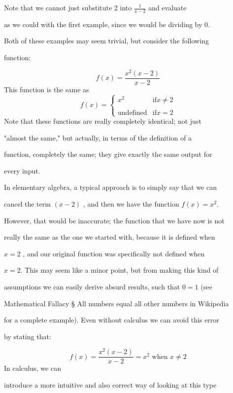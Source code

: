 Note that we cannot just substitute 2 into $\frac{1}{x-2}$ and evaluate

as we could with the first example, since we would be dividing by 0.



Both of these examples may seem trivial, but consider the following

function:



$$f(x)=\frac{x^2(x-2)}{x-2}$$ This function is the same as
$$
f(x)=

\begin{cases}

x^2 & \text{if} x \ne 2 \\\\ \text{undefined} & \text{if} x=2 

\end{cases}
$$
Note that these functions are really completely identical; not just

"almost the same," but actually, in terms of the definition of a

function, completely the same; they give exactly the same output for

every input.



In elementary algebra, a typical approach is to simply say that we can

cancel the term $(x-2)$ , and then we have the function $f(x)=x^2$.

However, that would be inaccurate; the function that we have now is not

really the same as the one we started with, because it is defined when

$x=2$ , and our original function was specifically not defined when

$x=2$. This may seem like a minor point, but from making this kind of

assumptions we can easily derive absurd results, such that $0=1$ (see

Mathematical Fallacy § All numbers equal all other numbers in Wikipedia

for a complete example). Even without calculus we can avoid this error

by stating that:



$$f(x)=\frac{x^2(x-2)}{x-2}=x^2\text{ when }x\ne2$$ In calculus, we can

introduce a more intuitive and also correct way of looking at this type

